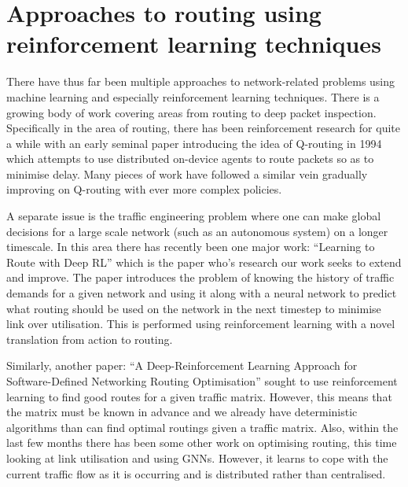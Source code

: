 \section{Approaches to routing using reinforcement learning techniques}

There have thus far been multiple approaches to network-related problems using machine learning and especially reinforcement learning techniques\cite{luong2019applications}. There is a growing body of work covering areas from routing to deep packet inspection. Specifically in the area of routing, there has been reinforcement research for quite a while with an early seminal paper introducing the idea of Q-routing in 1994\cite{boyan1994packet} which attempts to use distributed on-device agents to route packets so as to minimise delay. Many pieces of work have followed a similar vein gradually improving on Q-routing with ever more complex policies\cite{you2019toward,Ali2019HierarchicalDD}.

A separate issue is the traffic engineering problem where one can make global decisions for a large scale network (such as an autonomous system) on a longer timescale. In this area there has recently been one major work: ``Learning to Route with Deep RL''\cite{valadarsky2017learning} which is the paper who's research our work seeks to extend and improve. The paper introduces the problem of knowing the history of traffic demands for a given network and using it along with a neural network to predict what routing should be used on the network in the next timestep to minimise link over utilisation. This is performed using reinforcement learning with a novel translation from action to routing.

Similarly, another paper: ``A Deep-Reinforcement Learning Approach for Software-Defined Networking Routing Optimisation''\cite{stampa2017deep} sought to use reinforcement learning to find good routes for a given traffic matrix. However, this means that the matrix must be known in advance and we already have deterministic algorithms than can find optimal routings given a traffic matrix. Also, within the last few months there has been some other work on optimising routing, this time looking at link utilisation and using GNNs\cite{Sawada2020NetworkRO}. However, it learns to cope with the current traffic flow as it is occurring and is distributed rather than centralised.
